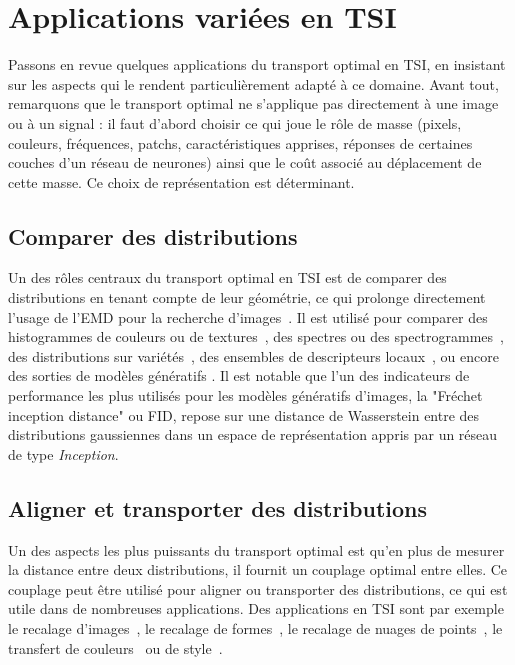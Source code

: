 \documentclass[11pt,a4paper]{article}
\newcommand{\rf}[1]{\textcolor{red}{#1}}
\begin{document}


\section{Applications variées en TSI}

Passons en revue quelques applications du transport optimal en TSI, en insistant sur les aspects qui le rendent particulièrement adapté à ce domaine. Avant tout, remarquons que le transport optimal ne s’applique pas directement à une image ou à un signal : il faut d’abord choisir ce qui joue le rôle de masse (pixels, couleurs, fréquences, patchs, caractéristiques apprises, réponses de certaines couches d'un réseau de neurones) ainsi que le coût associé au déplacement de cette masse. Ce choix de représentation est déterminant.


\subsection{Comparer des distributions}
\label{sec:comparer-distributions}
Un des rôles centraux du transport optimal en TSI est de comparer des
distributions en tenant compte de leur géométrie, ce qui prolonge directement
l'usage de l'EMD pour la recherche d'images~\cite{Rubner2000}. Il est utilisé
pour comparer des histogrammes de couleurs ou de textures~\cite{Rabin2012}, des
spectres ou des
spectrogrammes~\cite{flamary2016optimal,cazelles2020wasserstein}, des
distributions sur variétés~\cite{Solomon2015}, des ensembles de descripteurs
locaux~\cite{rabin2009statistical}, ou encore des sorties de modèles génératifs
\cite{Arjovsky2017}. Il est notable que l’un des indicateurs de performance les plus utilisés pour les modèles génératifs d'images, la "Fréchet inception distance" ou FID, repose sur une distance de
Wasserstein entre des distributions gaussiennes \cite{heusel2017gans} dans un
espace de représentation appris par un réseau de type {\em Inception}. 



\subsection{Aligner et transporter des distributions} Un des aspects les plus
puissants du transport optimal est qu'en plus de mesurer la distance entre deux
distributions, il fournit un couplage optimal entre elles. Ce couplage peut être
utilisé pour aligner ou transporter des distributions, ce qui est utile dans de
nombreuses applications. Des applications en TSI sont par exemple le recalage
d'images~\cite{Haker2004}, le recalage de formes~\cite{feydy2017optimal}, le
recalage de nuages de points~\cite{bonneel2019spot}, le transfert de
couleurs~\cite{Ferradans2014} ou de style~\cite{Mroueh:2019aa,boite2025differentiable}.
\end{document}
